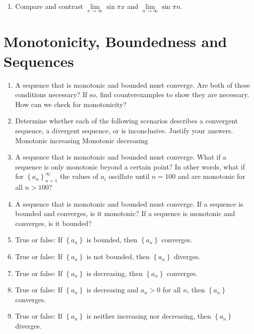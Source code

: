 \begin{enumerate}
\item Compare and contrast $
\mathop {\lim }\limits_{x \to \infty } \sin \pi x$ and $
\mathop {\lim }\limits_{n \to \infty } \sin \pi n$.  \cite{SM}

\end{enumerate}\section{Monotonicity, Boundedness and Sequences}\begin{enumerate}

\item A sequence that is monotonic and bounded must converge.  Are both of these conditions necessary?  If so, find counterexamples to show they are necessary.  How can we check for monotonicity?

\item Determine whether each of the following scenarios describes a convergent sequence, a divergent sequence, or is inconclusive.  Justify your answers.
Monotonic increasing	Monotonic decreasing

\item A sequence that is monotonic and bounded must converge.  What if a sequence is only monotonic beyond a certain point?  In other words, what if for $
\left\{ {a_n } \right\}_{n = 1}^\infty  $ the values of $a_i$ oscillate until $n = 100$ and are monotonic for all $n > 100$?

\item A sequence that is monotonic and bounded must converge.  If a sequence is bounded and converges, is it monotonic?  If a sequence is monotonic and converges, is it bounded?

\item True or false: If $
\left\{ {a_n } \right\}$ is bounded, then $\left\{ {a_n } \right\}$ converges.	

\item True or false: If $\left\{ {a_n } \right\}$ is not bounded, then $\left\{ {a_n } \right\}$ diverges.

\item True or false: If $
\left\{ {a_n } \right\}$ is decreasing, then $\left\{ {a_n } \right\}$ converges.

\item True or false:  If $\left\{ {a_n } \right\}$ is decreasing and $a_n > 0$ for all  $n$, then $\left\{ {a_n } \right\}$ converges.

\item True or false: If $
\left\{ {a_n } \right\}$ is neither increasing nor decreasing, then $\left\{ {a_n } \right\}$diverges.


\end{enumerate}
